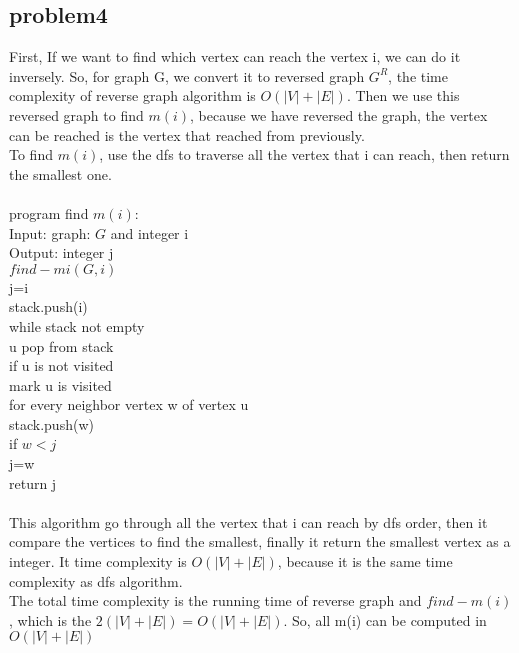 \documentclass[11pt]{article}
\newcommand\tab[1][1cm]{\hspace*{#1}}
\begin{document}
\subsection{problem4}
First, If we want to find which vertex can reach the vertex i, we can do it inversely. So, for graph G, we convert it to reversed graph $G^R$, the time complexity of reverse graph algorithm is $O(|V|+|E|)$. Then we use this reversed graph to find $m(i)$, because we have reversed the graph, the vertex can be reached is the vertex that reached from previously.
\\ To find $m(i)$, use the dfs to traverse all the vertex that i can reach, then return the smallest one.\\
\\
program find $m(i)$: \\
Input:  graph: $G$ and integer i\\
Output: integer j \\
$find-mi(G,i)$\\
j=i \\
stack.push(i)\\
while stack not empty\\
\tab u pop from stack \\
\tab if u is not visited\\
\tab \tab mark u is visited\\
\tab \tab	for every neighbor vertex w of vertex u\\
\tab \tab \tab stack.push(w) \\
\tab \tab \tab if $w<j$\\
\tab \tab \tab \tab j=w \\
return j \\
\\
This algorithm go through all the vertex that i can reach by dfs order, then it compare the vertices to find the smallest, finally it return the smallest vertex as a integer. It time complexity is $O(|V|+|E|)$, because it is the same time complexity as dfs algorithm.  
\\The total time complexity is the running time of reverse graph and $find-m(i)$, which is the $2(|V|+|E|)=O(|V|+|E|)$. So, all m(i) can be computed in $O(|V|+|E|)$
\end{document}
